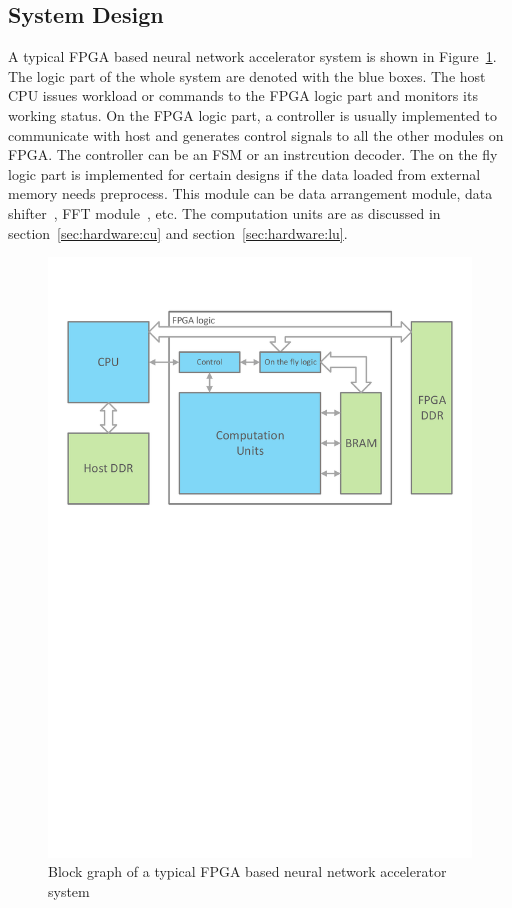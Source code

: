 \subsection{System Design}\label{sec:hardware:sys}

A typical FPGA based neural network accelerator system is shown in Figure~\ref{fig:sys}. The logic part of the whole system are denoted with the blue boxes. The host CPU issues workload or commands to the FPGA logic part and monitors its working status. On the FPGA logic part, a controller is usually implemented to communicate with host and generates control signals to all the other modules on FPGA. The controller can be an FSM or an instrcution decoder. The on the fly logic part is implemented for certain designs if the data loaded from external memory needs preprocess. This module can be data arrangement module, data shifter~\cite{qiu2016going}, FFT module~\cite{zhang2017frequency}, etc. The computation units are as discussed in section~\ref{sec:hardware:cu} and section~\ref{sec:hardware:lu}.

\begin{figure}[t]
    \centering
    \includegraphics[width=0.8\columnwidth]{fig/sys.pdf}
    \caption{Block graph of a typical FPGA based neural network accelerator system}
    \label{fig:sys}
\end{figure}


